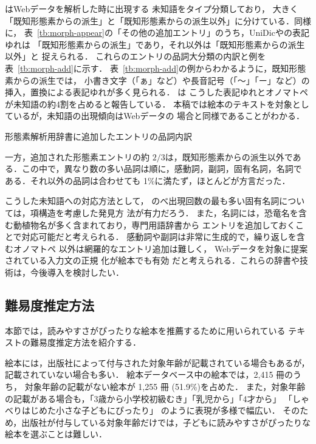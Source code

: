 \documentclass[japanese]{jnlp_1.4}
\newcommand{\lxd}{}
\begin{document}
はWebデータを解析した時に出現する
未知語をタイプ分類しており，
大きく「既知形態素からの派生」と「既知形態素からの派生以外」に分けている．同様に，
表~\ref{tb:morph-appear}の「その他の追加エントリ」のうち，UniDicや\lxd{}の表記ゆれは
「既知形態素からの派生」であり，それ以外は「既知形態素からの派生以外」と
捉えられる．
これらのエントリの品詞大分類の内訳と例を表~\ref{tb:morph-add}に示す．
表~\ref{tb:morph-add}の例からわかるように，既知形態素からの派生では，
小書き文字（「ぁ」など）や長音記号（「〜」「ー」など）の挿入，置換による表記ゆれが多く見られる．
は
こうした表記ゆれとオノマトペが未知語の約4割を占めると報告している．
本稿では絵本のテキストを対象としているが，未知語の出現傾向はWebデータの
場合と同様であることがわかる．


\begin{table}[b]
\caption{形態素解析用辞書に追加したエントリの品詞内訳}
\label{tb:morph-add}

\end{table}

一方，追加された形態素エントリの約 $2/3$は，既知形態素からの派生以外であ
る．この中で，異なり数の多い品詞は順に，感動詞，副詞，固有名詞，名詞で
ある．それ以外の品詞は合わせても 1\%に満たず，ほとんどが方言だった．

こうした未知語への対応方法として，
のべ出現回数の最も多い固有名詞については，項構造を考慮した発見方
法\cite{Sasano:Kurohashi:2008j}が有力だろう．
また，名詞には，恐竜名を含む動植物名が多く含まれており，専門用語辞書から
エントリを追加しておくことで対応可能だと考えられる．
感動詞や副詞は非常に生成的で，繰り返しを含むオノマトペ\cite{Sasano:Kurohashi:Okumura:2014j}
以外は網羅的なエントリ追加は難しく，
Webデータを対象に提案されている入力文の正規
化\cite{Saito:etal:2015j,Sasano:Kurohashi:Okumura:2014j}が絵本でも有効
だと考えられる．これらの辞書や技術は，今後導入を検討したい．


\subsection{難易度推定方法}
\label{sec:readability}

本節では，読みやすさがぴったりな絵本を推薦するために用いられている
テキストの難易度推定方法を紹介する．


絵本には，出版社によって付与された対象年齢が記載されている場合もあるが，
記載されていない場合も多い．
絵本データベース中の絵本では，2,415 冊のうち，
対象年齢の記載がない絵本が 1,255 冊 (51.9\%)を占めた．
また，対象年齢の記載がある場合も，「3歳から小学校初級むき」「乳児から」「4才から」
「しゃべりはじめた小さな子どもにぴったり」
のように表現が多様で幅広い．
そのため，出版社が付与している対象年齢だけでは，子どもに読みやすさがぴったりな絵本を選ぶことは難しい．
\end{document}
